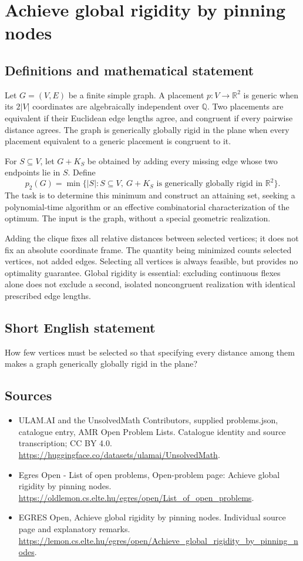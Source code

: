 \documentclass[11pt,a4paper]{article}
\begin{document}
\section*{Achieve global rigidity by pinning nodes}\label{statement}

\subsection{Definitions and mathematical statement}
Let $G=(V,E)$ be a finite simple graph. A placement $p:V\to\mathbb R^2$
is generic when its $2|V|$ coordinates are algebraically independent over
$\mathbb Q$. Two placements are equivalent if their Euclidean edge lengths
agree, and congruent if every pairwise distance agrees. The graph is
generically globally rigid in the plane when every placement equivalent
to a generic placement is congruent to it.

For $S\subseteq V$, let $G+K_S$ be obtained by adding every missing edge
whose two endpoints lie in $S$. Define
\[
 p_2(G)=\min\{|S|:S\subseteq V,\ G+K_S
                     \text{ is generically globally rigid in }\mathbb R^2\}.
\]
The task is to determine this minimum and construct an attaining set,
seeking a polynomial-time algorithm or an effective combinatorial
characterization of the optimum. The input is the graph, without a
special geometric realization.

Adding the clique fixes all relative distances between selected vertices;
it does not fix an absolute coordinate frame. The quantity being minimized
counts selected vertices, not added edges. Selecting all vertices is always
feasible, but provides no optimality guarantee. Global rigidity is essential:
excluding continuous flexes alone does not exclude a second, isolated
noncongruent realization with identical prescribed edge lengths.
\subsection{Short English statement}
How few vertices must be selected so that specifying every distance
among them makes a graph generically globally rigid in the plane?
\subsection{Sources}
\begin{itemize}
\item[S1] ULAM.AI and the UnsolvedMath Contributors, supplied problems.json, catalogue entry, AMR Open Problem Lists. Catalogue identity and source transcription; CC BY 4.0.
\url{https://huggingface.co/datasets/ulamai/UnsolvedMath}.
\item[S2] Egres Open - List of open problems, Open-problem page: Achieve global rigidity by pinning nodes. 
\url{https://oldlemon.cs.elte.hu/egres/open/List_of_open_problems}.
\item[S3] EGRES Open, Achieve global rigidity by pinning nodes. Individual source page and explanatory remarks.
\url{https://lemon.cs.elte.hu/egres/open/Achieve_global_rigidity_by_pinning_nodes}.
\end{itemize}
\end{document}
